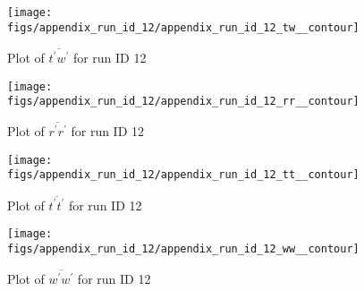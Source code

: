 \begin{figure}[H]
\centering
\texttt{[image: figs/appendix\_run\_id\_12/appendix\_run\_id\_12\_tw\_\_contour]}
\caption{Plot of $\overline{t^\prime w^\prime}$ for run ID 12}
\label{fig:appendix_run_id_12_tw__contour}
\end{figure}


\begin{figure}[H]
\centering
\texttt{[image: figs/appendix\_run\_id\_12/appendix\_run\_id\_12\_rr\_\_contour]}
\caption{Plot of $\overline{r^\prime r^\prime}$ for run ID 12}
\label{fig:appendix_run_id_12_rr__contour}
\end{figure}


\begin{figure}[H]
\centering
\texttt{[image: figs/appendix\_run\_id\_12/appendix\_run\_id\_12\_tt\_\_contour]}
\caption{Plot of $\overline{t^\prime t^\prime}$ for run ID 12}
\label{fig:appendix_run_id_12_tt__contour}
\end{figure}


\begin{figure}[H]
\centering
\texttt{[image: figs/appendix\_run\_id\_12/appendix\_run\_id\_12\_ww\_\_contour]}
\caption{Plot of $\overline{w^\prime w^\prime}$ for run ID 12}
\label{fig:appendix_run_id_12_ww__contour}
\end{figure}


